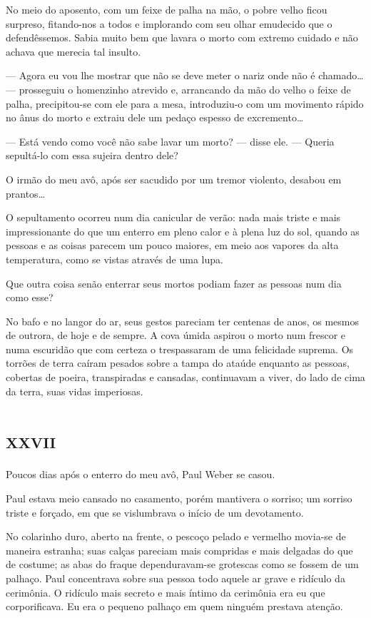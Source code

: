 No meio do aposento, com um feixe de palha na mão, o pobre velho ficou surpreso, fitando-nos a todos e implorando com seu olhar emudecido que o defendêssemos. Sabia muito bem que lavara o morto com extremo cuidado e não achava que merecia tal insulto.

--- Agora eu vou lhe mostrar que não se deve meter o nariz onde não é chamado\ldots{} --- prosseguiu o homenzinho atrevido e, arrancando da mão do velho o feixe de palha, precipitou-se com ele para a mesa, introduziu-o com um movimento rápido no ânus do morto e extraiu dele um pedaço espesso de excremento\ldots{}

--- Está vendo como você não sabe lavar um morto? --- disse ele. --- Queria sepultá-lo com essa sujeira dentro dele?

O irmão do meu avô, após ser sacudido por um tremor violento, desabou em prantos\ldots{}

O sepultamento ocorreu num dia canicular de verão: nada mais triste e mais impressionante do que um enterro em pleno calor e à plena luz do sol, quando as pessoas e as coisas parecem um pouco maiores, em meio aos vapores da alta temperatura, como se vistas através de uma lupa.

Que outra coisa senão enterrar seus mortos podiam fazer as pessoas num dia como esse?

No bafo e no langor do ar, seus gestos pareciam ter centenas de anos, os mesmos de outrora, de hoje e de sempre. A cova úmida aspirou o morto num frescor e numa escuridão que com certeza o trespassaram de uma felicidade suprema. Os torrões de terra caíram pesados sobre a tampa do ataúde enquanto as pessoas, cobertas de poeira, transpiradas e cansadas, continuavam a viver, do lado de cima da terra, suas vidas imperiosas. 


\chapter*{\huge\centering\textsc{xxvii}}

Poucos dias após o enterro do meu avô, Paul Weber se casou.

Paul estava meio cansado no casamento, porém mantivera o sorriso; um sorriso triste e forçado, em que se vislumbrava o início de um devotamento.

No colarinho duro, aberto na frente, o pescoço pelado e vermelho movia-se de maneira estranha; suas calças pareciam mais compridas e mais delgadas do que de costume; as abas do fraque dependuravam-se grotescas como se fossem de um palhaço. Paul concentrava sobre sua pessoa todo aquele ar grave e ridículo da cerimônia. O ridículo mais secreto e mais íntimo da cerimônia era eu que corporificava. Eu era o pequeno palhaço em quem ninguém prestava atenção.

